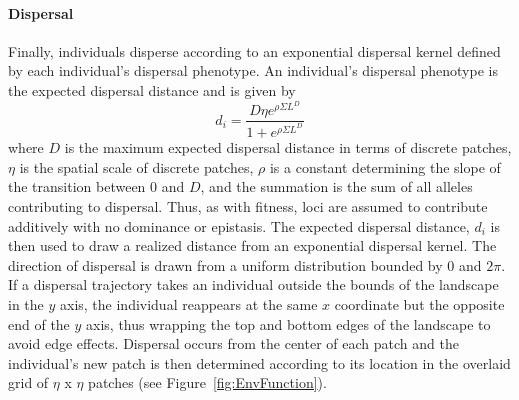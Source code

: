 \documentclass[11pt, oneside]{article}
\begin{document}
\paragraph{Dispersal}
Finally, individuals disperse according to an exponential dispersal kernel defined by each individual's dispersal phenotype. An individual's dispersal phenotype is the expected dispersal distance and is given by
\begin{equation}
d_{i} = \frac{D\eta e^{\rho\Sigma L^{D}}}{1+e^{\rho\Sigma L^{D}}} 
\end{equation}
where $D$ is the maximum expected dispersal distance in terms of discrete patches, $\eta$ is the spatial scale of discrete patches, $\rho$ is a constant determining the slope of the transition between $0$ and $D$, and the summation is the sum of all alleles contributing to dispersal. Thus, as with fitness, loci are assumed to contribute additively with no dominance or epistasis. The expected dispersal distance, $d_{i}$ is then used to draw a realized distance from an exponential dispersal kernel. The direction of dispersal is drawn from a uniform distribution bounded by $0$ and $2\pi$. If a dispersal trajectory takes an individual outside the bounds of the landscape in the $y$ axis, the individual reappears at the same $x$ coordinate but the opposite end of the $y$ axis, thus wrapping the top and bottom edges of the landscape to avoid edge effects. Dispersal occurs from the center of each patch and the individual's new patch is then determined according to its location in the overlaid grid of $\eta$ x $\eta$ patches (see Figure~\ref{fig:EnvFunction}).
\end{document}
